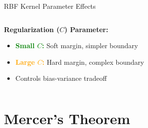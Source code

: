 \documentclass[8pt,aspectratio=1610]{beamer}
\begin{document}
\begin{frame}{RBF Kernel Parameter Effects}
\begin{columns}[t]
\begin{column}{0.48\textwidth}
\textbf{Regularization ($C$) Parameter:}
\begin{itemize}
\setlength{\itemsep}{1pt}
\item \textcolor{green}{\textbf{Small $C$:}} Soft margin, simpler boundary
\item \textcolor{orange}{\textbf{Large $C$:}} Hard margin, complex boundary
\item Controls bias-variance tradeoff
\end{itemize}
\end{column}
\end{columns}
\end{frame}

\section{Mercer's Theorem}
\end{document}
